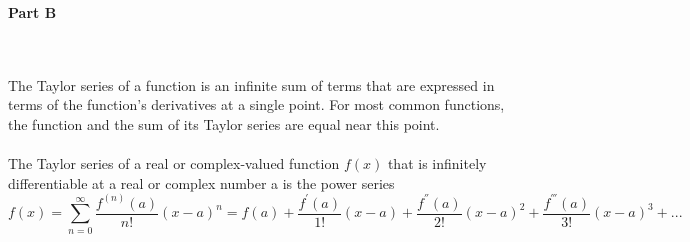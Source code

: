 \documentclass[fleqn]{article}
\begin{document}
  \pagebreak

  \textbf{Part B}

    \textcolor{hwColor}{
      \\
      \\
      The Taylor series of a function is an infinite sum of terms that are expressed in terms of the function's 
      derivatives at a single point. For most common functions, the function and the sum of its Taylor series are equal near this point. \\
      \\
      The Taylor series of a real or complex-valued function $f(x)$ that is infinitely differentiable 
      at a real or complex number a is the power series 
      $$f(x)=\sum\limits_{n=0}^{\infty} \dfrac{f^{(n)}(a)}{n!} \left(x-a\right)^n=f(a)+ \dfrac{f^'(a)}{1!} \left(x-a\right)+\dfrac{f^{''}(a)}{2!} \left(x-a\right)^2+\dfrac{f^{'''}(a)}{3!} \left(x-a\right)^3+...$$
    }
\end{document}

